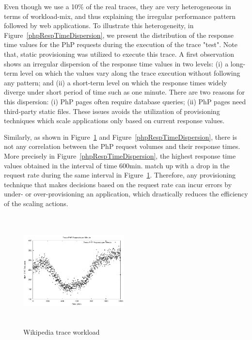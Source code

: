Even though we use a 10\% of the real traces, they are very heterogeneous in terms of workload-mix, and thus explaining the irregular performance pattern followed by web applications. To illustrate this heterogeneity, in Figure~\ref{phpRespTimeDispersion}, we present the distribution of the response time values for the PhP requests during the execution of the trace "test". Note that, static provisioning was utilized to execute this trace. A first observation shows an irregular dispersion of the response time values in two levels: (i) a long-term level on which the values vary along the trace execution without following any pattern; and (ii) a short-term level on which the response times widely diverge under short period of time such as one minute. There are two reasons for this dispersion: (i) PhP pages often require database queries; (ii) PhP pages need third-party static files. These issues avoids the utilization of provisioning techniques which scale applications only based on current response values. 

Similarly, as shown in Figure~\ref{workload} and Figure~\ref{phpRespTimeDispersion}, there is not any correlation between the PhP request volumes and their response times. More precisely in Figure~\ref{phpRespTimeDispersion}, the highest response time values obtained in the interval of time 600min. match up with a drop in the request rate during the same interval in Figure~\ref{workload}. Therefore, any provisioning technique that makes decisions based on the request rate can incur errors by under- or over-provisioning an application, which drastically reduces the efficiency of the scaling actions. 





\begin{figure}
\begin{center}
\includegraphics[width=0.49\textwidth, height=6cm]{./images/traceWorkload}
\end{center}
\caption{Wikipedia trace workload}
\label{workload}
\end{figure}

